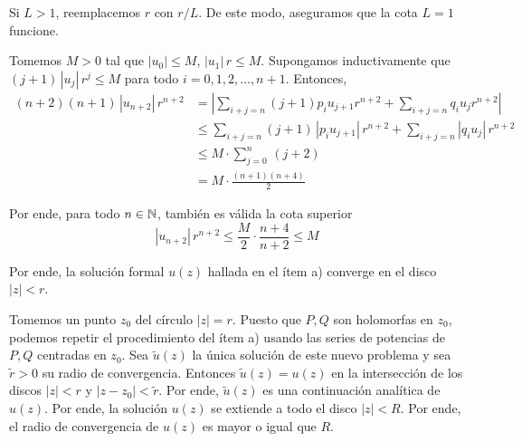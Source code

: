 \begin{solution}
\begin{enumerate}[label=\alph*)]
    Si $L > 1$, reemplacemos $r$ con $r/L$. De este modo, aseguramos que la cota $L = 1$ funcione.
    
    Tomemos $M > 0$ tal que $|u_0| \le M$, $|u_1| \, r \le M$. Supongamos inductivamente que $(j+1) \,|u_j| \, r^j \le M$ para todo $i = 0, 1, 2, \dots, n+1$. Entonces,
    \begin{align*}
    (n+2) (n+1) \, |u_{n+2}| \, r^{n+2}
        & = \left| \sum_{i+j=n} (j+1) p_i u_{j+1} r^{n+2} + \sum_{i+j=n} q_i u_j r^{n+2} \right| \\
        & \le \sum_{i+j=n} (j+1) \, |p_i u_{j+1}| \, r^{n+2} + \sum_{i+j=n} |q_i u_j| \, r^{n+2} \\
        & \le M \cdot \sum_{j=0}^n \, (j+2) \\
        & = M \cdot \frac {(n+1) (n+4)} 2
    \end{align*}
    
    Por ende, para todo $n \in \mathbb N$, también es válida la cota superior
    $$|u_{n+2}| \, r^{n+2} \le \frac M2 \cdot \frac {n+4} {n+2} \le M$$
    
    Por ende, la solución formal $u(z)$ hallada en el ítem a) converge en el disco $|z| < r$.
    
    Tomemos un punto $z_0$ del círculo $|z| = r$. Puesto que $P, Q$ son holomorfas en $z_0$, podemos repetir el procedimiento del ítem a) usando las series de potencias de $P, Q$ centradas en $z_0$. Sea $\tilde u(z)$ la única solución de este nuevo problema y sea $\tilde r > 0$ su radio de convergencia. Entonces $\tilde u(z) = u(z)$ en la intersección de los discos $|z| < r$ y $|z - z_0| < \tilde r$. Por ende, $\tilde u(z)$ es una continuación analítica de $u(z)$. Por ende, la solución $u(z)$ se extiende a todo el disco $|z| < R$. Por ende, el radio de convergencia de $u(z)$ es mayor o igual que $R$.
\end{enumerate}
\end{solution}
